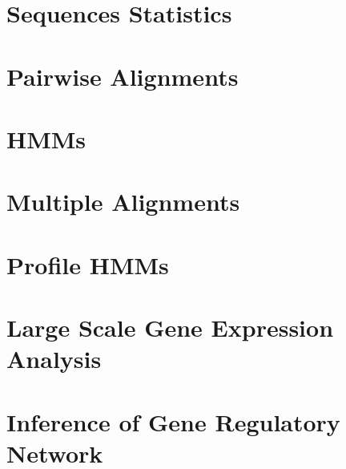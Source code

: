 \documentclass[12pt]{article} %
\begin{document}
\newpage
\section{Sequences Statistics}


\section{Pairwise Alignments}


\section{HMMs}


\section{Multiple Alignments}


\section{Profile HMMs}


\section{Large Scale Gene Expression Analysis}


\section{Inference of Gene Regulatory Network}



\end{document}
